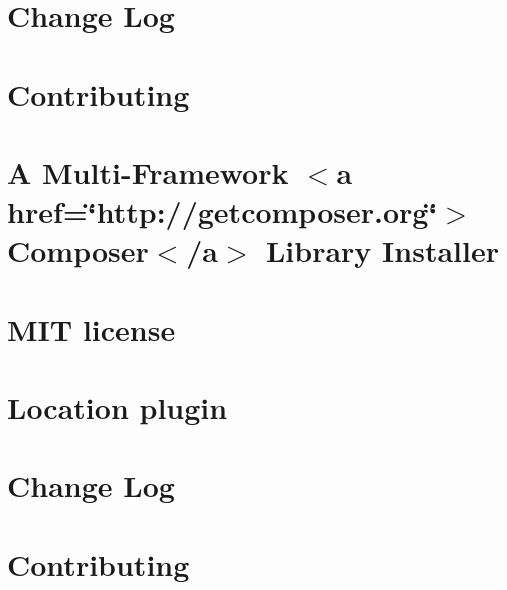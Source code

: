 \let\mypdfximage\pdfximage\def\pdfximage{\immediate\mypdfximage}\documentclass[twoside]{book}
\newcommand{\+}{\discretionary{\mbox{\scriptsize$\hookleftarrow$}}{}{}}
\begin{document}
\chapter{Change Log}
\label{md_rainlab_builder_vendor_composer_installers__c_h_a_n_g_e_l_o_g}

\chapter{Contributing}
\label{md_rainlab_builder_vendor_composer_installers__c_o_n_t_r_i_b_u_t_i_n_g}

\chapter{A Multi-\/\+Framework $<$a href=\char`\"{}http\+://getcomposer.\+org\char`\"{}$>$Composer$<$/a$>$ Library Installer}
\label{md_rainlab_builder_vendor_composer_installers__r_e_a_d_m_e}

\chapter{MIT license}
\label{md_rainlab_location__l_i_c_e_n_c_e}

\chapter{Location plugin}
\label{md_rainlab_location__r_e_a_d_m_e}

\chapter{Change Log}
\label{md_rainlab_location_vendor_composer_installers__c_h_a_n_g_e_l_o_g}

\chapter{Contributing}
\label{md_rainlab_location_vendor_composer_installers__c_o_n_t_r_i_b_u_t_i_n_g}

\end{document}
